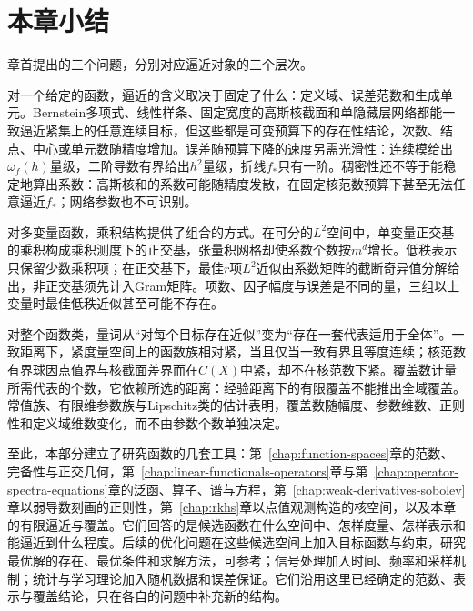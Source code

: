 
\section{本章小结}
\label{sec:apx-summary}

章首提出的三个问题，分别对应逼近对象的三个层次。

对一个给定的函数，逼近的含义取决于固定了什么：定义域、误差范数和生成单元。Bernstein多项式、线性样条、固定宽度的高斯核截面和单隐藏层网络都能一致逼近紧集上的任意连续目标，但这些都是可变预算下的存在性结论，次数、结点、中心或单元数随精度增加。误差随预算下降的速度另需光滑性：连续模给出$\omega_f(h)$量级，二阶导数有界给出$h^2$量级，折线$f_*$只有一阶。稠密性还不等于能稳定地算出系数：高斯核和的系数可能随精度发散，在固定核范数预算下甚至无法任意逼近$f_*$；网络参数也不可识别。

对多变量函数，乘积结构提供了组合的方式。在可分的$L^2$空间中，单变量正交基的乘积构成乘积测度下的正交基，张量积网格却使系数个数按$m^d$增长。低秩表示只保留少数乘积项；在正交基下，最佳$r$项$L^2$近似由系数矩阵的截断奇异值分解给出，非正交基须先计入Gram矩阵。项数、因子幅度与误差是不同的量，三组以上变量时最佳低秩近似甚至可能不存在。

对整个函数类，量词从“对每个目标存在近似”变为“存在一套代表适用于全体”。一致距离下，紧度量空间上的函数族相对紧，当且仅当一致有界且等度连续；核范数有界球因点值界与核截面差界而在$C(X)$中紧，却不在核范数下紧。覆盖数计量所需代表的个数，它依赖所选的距离：经验距离下的有限覆盖不能推出全域覆盖。常值族、有限维参数族与Lipschitz类的估计表明，覆盖数随幅度、参数维数、正则性和定义域维数变化，而不由参数个数单独决定。

至此，本部分建立了研究函数的几套工具：第~\ref{chap:function-spaces}章的范数、完备性与正交几何，第~\ref{chap:linear-functionals-operators}章与第~\ref{chap:operator-spectra-equations}章的泛函、算子、谱与方程，第~\ref{chap:weak-derivatives-sobolev}章以弱导数刻画的正则性，第~\ref{chap:rkhs}章以点值观测构造的核空间，以及本章的有限逼近与覆盖。它们回答的是候选函数在什么空间中、怎样度量、怎样表示和能逼近到什么程度。后续的优化问题在这些候选空间上加入目标函数与约束，研究最优解的存在、最优条件和求解方法，可参考；信号处理加入时间、频率和采样机制；统计与学习理论加入随机数据和误差保证。它们沿用这里已经确定的范数、表示与覆盖结论，只在各自的问题中补充新的结构。
